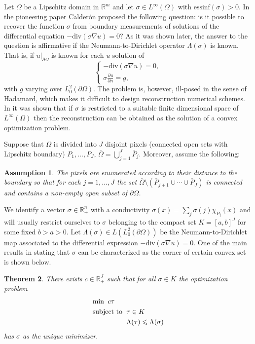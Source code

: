 \documentclass{article}
\newtheorem{theorem}{Theorem}
\newtheorem{assumption}[theorem]{Assumption}
\theoremstyle{definition}
\theoremstyle{remark}
\renewcommand{\leq}{\leqslant}
\begin{document}
Let $\Omega$ be a Lipschitz domain in $\mathbb R^m$ and let $\sigma\in L^\infty(\Omega)$ with $\text{essinf}(\sigma)>0$.
In the pioneering paper \cite{calderonpioneer} Calder\'on proposed the following question: is it possible to recover the function $\sigma$ from boundary measurements of solutions of the differential equation $-\text{div}(\sigma\nabla u)=0$?
As it was shown later, the answer to the question is affirmative if the Neumann-to-Dirichlet operator $\Lambda(\sigma)$ is known.
That is, if $u|_{\partial\Omega}$ is known for each $u$ solution of
\begin{equation}
\begin{cases}
-\text{div}(\sigma\nabla u)=0,\\
\sigma\frac{\partial u}{\partial n} = g,
\end{cases}
\end{equation}
with $g$ varying over $L^2_0(\partial\Omega)$.
The problem is, however, ill-posed in the sense of Hadamard, which makes it difficult to design reconstruction numerical schemes.
In \cite{convexcalderon} it was shown that if $\sigma$ is restricted to a suitable finite dimensional space of $L^\infty(\Omega)$ then the reconstruction can be obtained as the solution of a convex optimization problem.

Suppose that $\Omega$ is divided into $J$ disjoint pixels (connected open sets with Lipschitz boundary) $P_1,\dots,P_J$, $\overline\Omega = \bigcup_{j=1}^J \overline{P}_j$.
Moreover, assume the following:
\begin{assumption}\label{as:labeling}
The pixels are enumerated according to their distance to the boundary so that for each $j=1,\dots,J$ the set $\overline\Omega \setminus \left(\overline P_{j+1}\cup\cdots\cup \overline P_J\right)$ is connected and contains a non-empty open subset of $\partial\Omega$.
\end{assumption}
We identify a vector $\sigma\in\mathbb R^n_+$ with a conductivity $\sigma(x) = \sum_j \sigma(j) \chi_{P_j}(x)$ and will usually restrict ourselves to $\sigma$ belonging to the compact set $K = [a,b]^J$ for some fixed $b>a>0$.
Let $\Lambda(\sigma) \in L(L_0^2(\partial\Omega))$ be the Neumann-to-Dirichlet map associated to the differential expression $-\text{div}(\sigma\nabla u)=0$.
One of the main results in \cite{convexcalderon} stating that $\sigma$ can be characterized as the corner of certain convex set is shown below.

\begin{theorem}\label{thm:important}
There exists $c\in\mathbb R^J_+$ such that for all $\sigma\in K$ the optimization problem
\begin{align}
& \textup{min}\;\; c\tau \nonumber \\
& \textup{subject to }\; \tau \in K \label{eq:optimization} \\
& \phantom{\textup{subject to }\;} \Lambda(\tau) \leq \Lambda(\sigma) \nonumber
\end{align}
has $\sigma$ as the unique minimizer.
\end{theorem}
\end{document}
